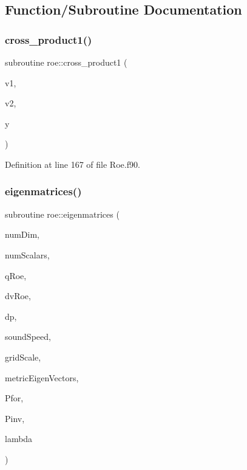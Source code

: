 \subsection{Function/\+Subroutine Documentation}
\hypertarget{namespaceroe_abdb2a52cc70419994c076b8f904a3450}{}\label{namespaceroe_abdb2a52cc70419994c076b8f904a3450} 
\subsubsection{\texorpdfstring{cross\+\_\+product1()}{cross\_product1()}}
{\footnotesize\ttfamily subroutine roe\+::cross\+\_\+product1 (\begin{DoxyParamCaption}\item[{real(kind=8), dimension(3)}]{v1,  }\item[{real(kind=8), dimension(3)}]{v2,  }\item[{real(kind=8), dimension(3)}]{y }\end{DoxyParamCaption})}



Definition at line 167 of file Roe.\+f90.

\hypertarget{namespaceroe_acb3b55f2bf22c43e91196d4915f7fecb}{}\label{namespaceroe_acb3b55f2bf22c43e91196d4915f7fecb} 
\subsubsection{\texorpdfstring{eigenmatrices()}{eigenmatrices()}}
{\footnotesize\ttfamily subroutine roe\+::eigenmatrices (\begin{DoxyParamCaption}\item[{integer(kind=4), intent(in)}]{num\+Dim,  }\item[{integer(kind=4), intent(in)}]{num\+Scalars,  }\item[{real(kind=8), dimension(numdim+2+numscalars), intent(in)}]{q\+Roe,  }\item[{real(kind=8), dimension(numdim+2), intent(in)}]{dv\+Roe,  }\item[{real(kind=8), dimension(2+numscalars), intent(in)}]{dp,  }\item[{real(kind=8), intent(in)}]{sound\+Speed,  }\item[{real(kind=8), intent(in)}]{grid\+Scale,  }\item[{real(kind=8), dimension(numdim$\ast$numdim), intent(in)}]{metric\+Eigen\+Vectors,  }\item[{real(kind=8), dimension(numdim+2+numscalars,numdim+2+numscalars), intent(out)}]{Pfor,  }\item[{real(kind=8), dimension(numdim+2+numscalars,numdim+2+numscalars), intent(out)}]{Pinv,  }\item[{real(kind=8), dimension(numdim+2+numscalars,numdim+2+numscalars), intent(out)}]{lambda }\end{DoxyParamCaption})}



